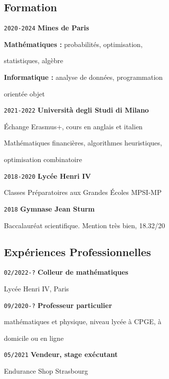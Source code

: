 \documentclass{article}
\begin{document}
\setlength{\columnsep}{2cm}
\setlength{\columnseprule}{1.5pt}
\begin{multicols}{2}
	{\color{blue} \subsection*{Formation}}

		\noindent\texttt{2020-2024} \textbf{Mines de Paris}

		\textbf{Mathématiques : } probabilités, optimisation, 

		statistiques, algèbre

		\textbf{Informatique : } analyse de données, programmation 

		orientée objet

\hfill

		\noindent\texttt{2021-2022} \textbf{Università degli Studi di Milano}

		Échange Erasmus+, cours en anglais et italien

		Mathématiques financières, algorithmes heuristiques, 

		optimisation combinatoire

\hfill

		\noindent\texttt{2018-2020} \textbf{Lycée Henri IV}
		
		Classes Préparatoires aux Grandes Écoles MPSI-MP

\hfill

		\noindent\texttt{2018} \textbf{Gymnase Jean Sturm}

		Baccalauréat scientifique. Mention très bien, 18.32/20

\hfill

	{\color{blue} \subsection*{Expériences Professionnelles}}

		\noindent\texttt{02/2022-?} \textbf{Colleur de mathématiques}

		Lycée Henri IV, Paris


		\noindent\texttt{09/2020-?} \textbf{Professeur particulier}

		mathématiques et physique, niveau lycée à CPGE, à 

		domicile ou en ligne

\hfill
	
		\noindent\texttt{05/2021} \textbf{Vendeur, stage exécutant}

		Endurance Shop Strasbourg


\end{multicols}
\end{document}
